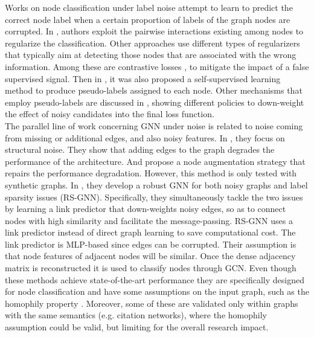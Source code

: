 \documentclass[twoside]{article}
\theoremstyle{definition}
\begin{document}
Works on node classification under label noise attempt to learn to predict the correct node label when a certain proportion of labels of the graph nodes are corrupted. 
In \cite{pairwiseinteraction4}, authors exploit the pairwise interactions existing among nodes to regularize the classification.
Other approaches use different types of regularizers that typically aim at detecting those nodes that are associated with the wrong information. Among these are contrastive losses \cite{contrastivelearning5, cl9}, to mitigate the impact of a false supervised signal. Then in \cite{ssl8}, it was also proposed a self-supervised learning method to produce pseudo-labels assigned to each node. Other mechanisms that employ pseudo-labels are discussed in \cite{noisegovernance6, unionnet10, nrgnn11}, showing different policies to down-weight the effect of noisy candidates into the final loss function.\\
The parallel line of work concerning GNN under noise is related to noise coming from missing or additional edges, and also noisy features. 
In \cite{structuralnoise2}, they focus on structural noise. They show that adding edges to the graph degrades the performance of the architecture. And propose a node augmentation strategy that repairs the performance degradation. However, this method is only tested with synthetic graphs. In \cite{structuralnoise3}, they develop a robust GNN for both noisy graphs and label sparsity issues (RS-GNN). Specifically, they simultaneously tackle the two issues by learning a link predictor that down-weights noisy edges, so as to connect nodes with high similarity and facilitate the message-passing. RS-GNN uses a link predictor instead of direct graph learning to save computational cost.
The link predictor is MLP-based since edges can be corrupted. Their assumption is that node features of adjacent nodes will be similar. Once the dense adjacency matrix is reconstructed it is used to classify nodes through GCN. Even though these methods achieve state-of-the-art performance they are specifically designed for node classification and have some assumptions on the input graph, such as the homophily property \cite{structuralnoise3, pairwiseinteraction4, contrastivelearning5, nrgnn11}. Moreover, some of these are validated only within graphs with the same semantics \cite{structuralnoise3, pairwiseinteraction4, ssl8, cl9, unionnet10, nrgnn11} (e.g. citation networks), where the homophily assumption could be valid, but limiting for the overall research impact.\\
\end{document}
